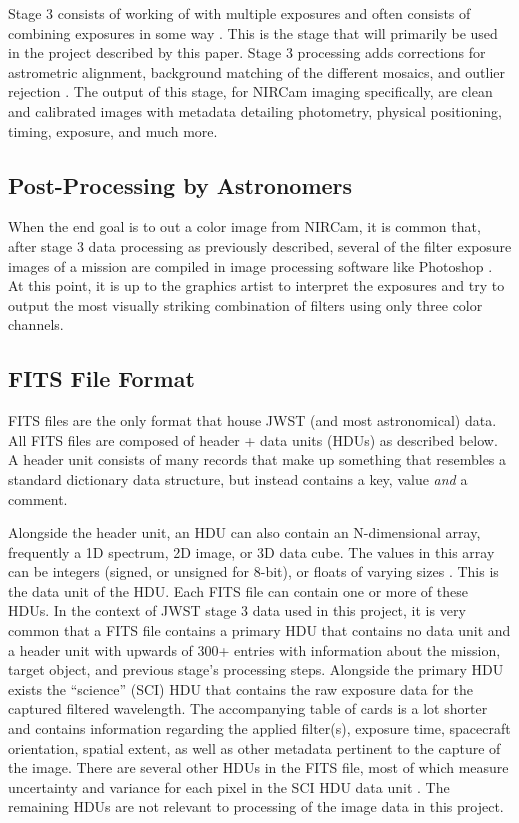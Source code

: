 \documentclass[10pt,twocolumn,letterpaper]{article}
\begin{document}
Stage 3 consists of working of with multiple exposures and often consists of combining exposures in some way \cite{webbstages}. 
This is the stage that will primarily be used in the project described by this paper. Stage 3 processing adds corrections for astrometric alignment, background matching of the different mosaics, and outlier rejection \cite{webbstage3}. 
The output of this stage, for NIRCam imaging specifically, are clean and calibrated images with metadata detailing photometry, physical positioning, timing, exposure, and much more.

\subsection{Post-Processing by Astronomers}
When the end goal is to out a color image from NIRCam, it is common that, after stage 3 data processing as previously described, several of the filter exposure images of a mission are compiled in image processing software like Photoshop \cite{editinterview}. At this point, it is up to the graphics artist to interpret the exposures and try to output the most visually striking combination of filters using only three color channels.

\subsection{FITS File Format}
FITS files are the only format that house JWST (and most astronomical) data. All FITS files are composed of header + data units (HDUs) as described below.
A header unit consists of many records that make up something that resembles a standard dictionary data structure, but instead contains a key, value \emph{and} a comment.

Alongside the header unit, an HDU can also contain an N-dimensional array, frequently a 1D spectrum, 2D image, or 3D data cube. The values in this array can be integers (signed, or unsigned for 8-bit), or floats of varying sizes \cite{fitsdoc}. This is the data unit of the HDU. Each FITS file can contain one or more of these HDUs.
In the context of JWST stage 3 data used in this project, it is very common that a FITS file contains a primary HDU that contains no data unit and a header unit with upwards of 300+ entries with information about the mission, target object, and previous stage's processing steps.
Alongside the primary HDU exists the ``science'' (SCI) HDU that contains the raw exposure data for the captured filtered wavelength. The accompanying table of cards is a lot shorter and contains information regarding the applied filter(s), exposure time, spacecraft orientation, spatial extent, as well as other metadata pertinent to the capture of the image.
There are several other HDUs in the FITS file, most of which measure uncertainty and variance for each pixel in the SCI HDU data unit \cite{webbfits}. The remaining HDUs are not relevant to processing of the image data in this project. 
\end{document}
